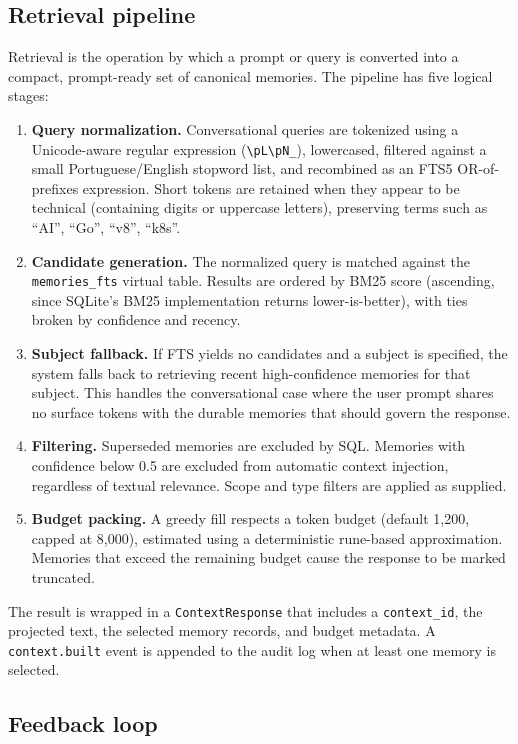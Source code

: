 \documentclass[11pt,a4paper]{article}
\begin{document}
\subsection{Retrieval pipeline}

Retrieval is the operation by which a prompt or query is converted into a compact, prompt-ready set of canonical memories. The pipeline has five logical stages:

\begin{enumerate}
 \item \textbf{Query normalization.} Conversational queries are tokenized using a Unicode-aware regular expression (\verb|\pL\pN_|), lowercased, filtered against a small Portuguese/English stopword list, and recombined as an FTS5 OR-of-prefixes expression. Short tokens are retained when they appear to be technical (containing digits or uppercase letters), preserving terms such as ``AI'', ``Go'', ``v8'', ``k8s''.
 \item \textbf{Candidate generation.} The normalized query is matched against the \texttt{memories\_fts} virtual table. Results are ordered by BM25 score (ascending, since SQLite's BM25 implementation returns lower-is-better), with ties broken by confidence and recency.
 \item \textbf{Subject fallback.} If FTS yields no candidates and a subject is specified, the system falls back to retrieving recent high-confidence memories for that subject. This handles the conversational case where the user prompt shares no surface tokens with the durable memories that should govern the response.
 \item \textbf{Filtering.} Superseded memories are excluded by SQL. Memories with confidence below 0.5 are excluded from automatic context injection, regardless of textual relevance. Scope and type filters are applied as supplied.
 \item \textbf{Budget packing.} A greedy fill respects a token budget (default 1{,}200, capped at 8{,}000), estimated using a deterministic rune-based approximation. Memories that exceed the remaining budget cause the response to be marked truncated.
\end{enumerate}

The result is wrapped in a \texttt{ContextResponse} that includes a \texttt{context\_id}, the projected text, the selected memory records, and budget metadata. A \texttt{context.built} event is appended to the audit log when at least one memory is selected.

\subsection{Feedback loop}
\end{document}
